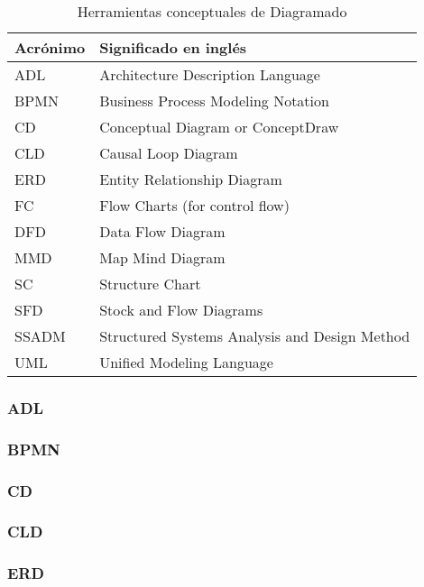 \begin{table}[h]
\centering
\caption{Herramientas conceptuales de Diagramado}
\label{Herramientas-conceptuales-de-Diagramado}
\begin{tabular}{|l|l|}
\hline
Acrónimo & Significado en inglés                         \\ \hline
ADL      & Architecture Description Language             \\ \hline
BPMN     & Business Process Modeling Notation            \\ \hline
CD       & Conceptual Diagram or ConceptDraw             \\ \hline
CLD      & Causal Loop Diagram                           \\ \hline
ERD      & Entity Relationship Diagram                   \\ \hline
FC       & Flow Charts (for control flow)                \\ \hline
DFD      & Data Flow Diagram                             \\ \hline
MMD      & Map Mind Diagram                              \\ \hline
SC       & Structure Chart                               \\ \hline
SFD      & Stock and Flow Diagrams                       \\ \hline
SSADM    & Structured Systems Analysis and Design Method \\ \hline
UML      & Unified Modeling Language                     \\ \hline
\end{tabular}
\end{table}

\subsubsection{ADL}
\subsubsection{BPMN}
\subsubsection{CD}
\subsubsection{CLD}
\subsubsection{ERD}
